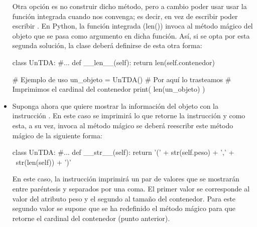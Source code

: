 \begin{itemize}
Otra opción es no construir dicho método, pero a cambio poder usar usar la función integrada  cuando nos convenga; es decir, en vez de escribir   poder escribir  . En Python, la función integrada \pyv(len())  invoca al método mágico  del objeto que se pasa como argumento en dicha función. Así,  si se opta por esta segunda solución, la clase deberá definirse de esta otra forma:

\hfil
\begin{minipage}{.45\textwidth}
\begin{pyconsole}[][frame=single]
class UnTDA:
   #...
   def __len__(self):
     return len(self.contenedor)

\end{pyconsole}
\end{minipage}
\begin{minipage}{.45\textwidth}
\begin{pyverbatim}[][frame=single]
# Ejemplo de uso
un_objeto = UnTDA()
# Por aquí lo trasteamos
# Imprimimos el cardinal del contenedor
print( len(un_objeto) )
\end{pyverbatim}
\end{minipage}

\item Suponga ahora que quiere mostrar la información del objeto con la 
instrucción . En este caso se imprimirá lo que retorne
la instrucción  y como esta, a su vez, invoca al método mágico
 se deberá reescribr este método mágico de la siguiente forma:


\hfil
\begin{minipage}{.55\textwidth}
\begin{pyconsole}[][frame=single]
class UnTDA:
   #...
   def __str__(self):
      return '(' + str(self.peso) + ',' + \
              str(len(self)) + ')'

\end{pyconsole}
\end{minipage}

En este caso, la instrucción  imprimirá un par de valores que se mostrarán entre paréntesis y separados por una coma.
El primer valor se corresponde al valor del atributo peso y el segundo al tamaño del contenedor.
Para este segundo valor se supone que se ha redefinido el método mágico \pyv{def __len__(self)}
para que retorne el cardinal del contenedor (punto anterior).



\end{itemize}
